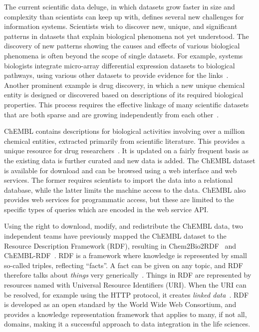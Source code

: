 \documentclass[10pt]{bmc_article}
\newenvironment{bmcformat}{\begin{raggedright}\baselineskip20pt\sloppy\setboolean{publ}{false}}{\end{raggedright}\baselineskip20pt\sloppy}
\begin{document}
\begin{bmcformat}
The current scientific data deluge, in which datasets grow faster in size and complexity than scientists can keep up with,
defines several new challenges for information systems. Scientists wish to 
discover new, unique, and significant patterns in datasets that explain biological 
phenomena not yet understood. The discovery of new patterns showing the 
causes and effects of various biological phenomena is often beyond the scope of single datasets.
For example, systems biologists integrate micro-array differential expression datasets to 
biological pathways, using various other datasets to provide evidence for the links~\cite{Staab2007}. 
Another prominent example is drug discovery, in which a new unique chemical entity is designed or discovered 
based on descriptions of its required biological properties. This process requires the effective 
linkage of many scientific datasets that are both sparse and are growing independently from each
other~\cite{Belleau2008,Samwald2011,Williams2012}.

ChEMBL contains descriptions for biological activities involving over a million chemical 
entities, extracted primarily from scientific literature. This provides a unique resource for drug researchers~\cite{Gaulton2012,Warr2009}.
It is updated on a fairly frequent basis as the existing data is further curated and new data is added. 
The ChEMBL dataset is available for download and can be browsed using a web interface and web services.
The former requires scientists to import the data into a relational database, while the 
latter limits the machine access to the data. ChEMBL also provides web services for programmatic
access, but these are limited to the specific types of queries which are encoded in the web service API. 

Using the right to download, modify, and redistribute the ChEMBL data, two independent teams
have previously mapped the ChEMBL dataset to the Resource Description Framework (RDF), resulting
in Chem2Bio2RDF~\cite{Chen2010} and ChEMBL-RDF~\cite{Willighagen2011}. RDF is a framework where
knowledge is represented by small so-called triples, reflecting ``facts''. A fact can
be given on any topic, and RDF therefore talks about \textit{things} very generically~\cite{Miller:04:RP}. Things in RDF
are represented by resources named with Universal Resource Identifiers (URI). When the URI can be resolved, 
for example using the HTTP protocol, it creates \emph{linked data}~\cite{Samwald2011}. RDF is
developed as an open standard by the World Wide Web Consortium, and provides a knowledge
representation framework that applies to many, if not all, domains, making it a successful 
approach to data integration in the life sciences.


\end{bmcformat}
\end{document}
